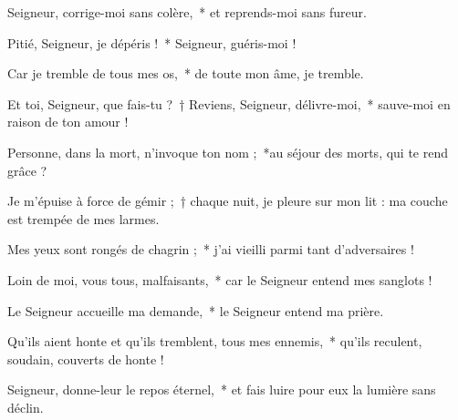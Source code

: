 \item Seigneur, corrige-moi sans colère,~* et reprends-moi sans fureur.

\item Pitié, Seigneur, je dépéris !~* Seigneur, guéris-moi !

\item Car je tremble de tous mes os,~* de toute mon âme, je tremble.

\item Et toi, Seigneur, que fais-tu ?~† Reviens, Seigneur, délivre-moi,~* sauve-moi en raison de ton amour !

\item Personne, dans la mort, n'invoque ton nom ;~*au séjour des morts, qui te rend grâce ?

\item Je m'épuise à force de gémir ;~† chaque nuit, je pleure sur mon lit : ma couche est trempée de mes larmes.

\item Mes yeux sont rongés de chagrin ;~* j'ai vieilli parmi tant d'adversaires !

\item Loin de moi, vous tous, malfaisants,~* car le Seigneur entend mes sanglots !

\item Le Seigneur accueille ma demande,~* le Seigneur entend ma prière.

\item Qu'ils aient honte et qu'ils tremblent, tous mes ennemis,~* qu'ils reculent, soudain, couverts de honte !

\item Seigneur, donne-leur le repos éternel,~* et fais luire pour eux la lumière sans déclin.